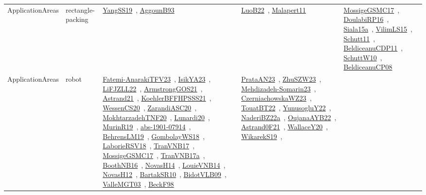 {\begin{longtable}{lp{3cm}>{\raggedright\arraybackslash}p{6cm}>{\raggedright\arraybackslash}p{6cm}>{\raggedright\arraybackslash}p{8cm}}
ApplicationAreas & rectangle-packing & \href{works/YangSS19.pdf}{YangSS19}~\cite{YangSS19}, \href{works/AggounB93.pdf}{AggounB93}~\cite{AggounB93} & \href{works/LuoB22.pdf}{LuoB22}~\cite{LuoB22}, \href{works/Malapert11.pdf}{Malapert11}~\cite{Malapert11} & \href{works/MossigeGSMC17.pdf}{MossigeGSMC17}~\cite{MossigeGSMC17}, \href{works/DoulabiRP16.pdf}{DoulabiRP16}~\cite{DoulabiRP16}, \href{works/Siala15a.pdf}{Siala15a}~\cite{Siala15a}, \href{works/VilimLS15.pdf}{VilimLS15}~\cite{VilimLS15}, \href{works/Schutt11.pdf}{Schutt11}~\cite{Schutt11}, \href{works/BeldiceanuCDP11.pdf}{BeldiceanuCDP11}~\cite{BeldiceanuCDP11}, \href{works/SchuttW10.pdf}{SchuttW10}~\cite{SchuttW10}, \href{works/BeldiceanuCP08.pdf}{BeldiceanuCP08}~\cite{BeldiceanuCP08}\\
ApplicationAreas & robot & \href{works/Fatemi-AnarakiTFV23.pdf}{Fatemi-AnarakiTFV23}~\cite{Fatemi-AnarakiTFV23}, \href{works/IsikYA23.pdf}{IsikYA23}~\cite{IsikYA23}, \href{works/LiFJZLL22.pdf}{LiFJZLL22}~\cite{LiFJZLL22}, \href{works/ArmstrongGOS21.pdf}{ArmstrongGOS21}~\cite{ArmstrongGOS21}, \href{works/Astrand21.pdf}{Astrand21}~\cite{Astrand21}, \href{works/KoehlerBFFHPSSS21.pdf}{KoehlerBFFHPSSS21}~\cite{KoehlerBFFHPSSS21}, \href{works/WessenCS20.pdf}{WessenCS20}~\cite{WessenCS20}, \href{works/ZarandiASC20.pdf}{ZarandiASC20}~\cite{ZarandiASC20}, \href{works/MokhtarzadehTNF20.pdf}{MokhtarzadehTNF20}~\cite{MokhtarzadehTNF20}, \href{works/Lunardi20.pdf}{Lunardi20}~\cite{Lunardi20}, \href{works/MurinR19.pdf}{MurinR19}~\cite{MurinR19}, \href{works/abs-1901-07914.pdf}{abs-1901-07914}~\cite{abs-1901-07914}, \href{works/BehrensLM19.pdf}{BehrensLM19}~\cite{BehrensLM19}, \href{works/GombolayWS18.pdf}{GombolayWS18}~\cite{GombolayWS18}, \href{works/LaborieRSV18.pdf}{LaborieRSV18}~\cite{LaborieRSV18}, \href{works/TranVNB17.pdf}{TranVNB17}~\cite{TranVNB17}, \href{works/MossigeGSMC17.pdf}{MossigeGSMC17}~\cite{MossigeGSMC17}, \href{works/TranVNB17a.pdf}{TranVNB17a}~\cite{TranVNB17a}, \href{works/BoothNB16.pdf}{BoothNB16}~\cite{BoothNB16}, \href{works/NovasH14.pdf}{NovasH14}~\cite{NovasH14}, \href{works/LouieVNB14.pdf}{LouieVNB14}~\cite{LouieVNB14}, \href{works/NovasH12.pdf}{NovasH12}~\cite{NovasH12}, \href{works/BartakSR10.pdf}{BartakSR10}~\cite{BartakSR10}, \href{works/BidotVLB09.pdf}{BidotVLB09}~\cite{BidotVLB09}, \href{works/ValleMGT03.pdf}{ValleMGT03}~\cite{ValleMGT03}, \href{works/BeckF98.pdf}{BeckF98}~\cite{BeckF98} & \href{works/PrataAN23.pdf}{PrataAN23}~\cite{PrataAN23}, \href{works/ZhuSZW23.pdf}{ZhuSZW23}~\cite{ZhuSZW23}, \href{works/Mehdizadeh-Somarin23.pdf}{Mehdizadeh-Somarin23}~\cite{Mehdizadeh-Somarin23}, \href{works/CzerniachowskaWZ23.pdf}{CzerniachowskaWZ23}~\cite{CzerniachowskaWZ23}, \href{works/TouatBT22.pdf}{TouatBT22}~\cite{TouatBT22}, \href{works/YunusogluY22.pdf}{YunusogluY22}~\cite{YunusogluY22}, \href{works/NaderiBZ22a.pdf}{NaderiBZ22a}~\cite{NaderiBZ22a}, \href{works/OujanaAYB22.pdf}{OujanaAYB22}~\cite{OujanaAYB22}, \href{works/Astrand0F21.pdf}{Astrand0F21}~\cite{Astrand0F21}, \href{works/WallaceY20.pdf}{WallaceY20}~\cite{WallaceY20}, \href{works/WikarekS19.pdf}{WikarekS19}~\cite{WikarekS19}, 
\end{longtable}}
